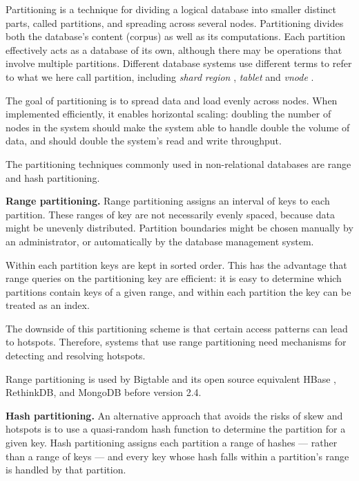 Partitioning is a technique for dividing a logical database into smaller distinct parts, called partitions, and spreading
across several nodes.
Partitioning divides both the database's content (corpus) as well as its computations.
Each partition effectively acts as a database of its own, although there may be operations that involve multiple partitions.
Different database systems use different terms to refer to what we here call partition, including \textit{shard} \cite{mongo:shards, elastic:shards}
\textit{region} \cite{hbase:regions}, \textit{tablet} \cite{bigtable:tablets} and \textit{vnode} \cite{cassandra:vnodes, riak:vnodes}.

The goal of partitioning is to spread data and load evenly across nodes.
When implemented efficiently, it enables horizontal scaling:
doubling the number of nodes in the system should make the system able to handle double the volume of data, and
should double the system's read and write throughput.

The partitioning techniques commonly used in non-relational databases are range and hash partitioning.

\bigskip
\noindent
\textbf{Range partitioning.}
Range partitioning assigns an interval of keys to each partition.
These ranges of key are not necessarily evenly spaced, because data might be unevenly distributed.
Partition boundaries might be chosen manually by an administrator, or automatically by the database management system.

Within each partition keys are kept in sorted order.
This has the advantage that range queries on the partitioning key are efficient:
it is easy to determine which partitions contain keys of a given range, and within each partition the key can be treated
as an index.

The downside of this partitioning scheme is that certain access patterns can lead to hotspots.
Therefore, systems that use range partitioning need mechanisms for detecting and resolving hotspots.

Range partitioning is used by Bigtable and its open source equivalent HBase \cite{hbasebigtable:comparison},
RethinkDB, and MongoDB before version 2.4.

\medskip
\noindent
{}

\bigskip
\noindent
\textbf{Hash partitioning.}
An alternative approach that avoids the risks of skew and hotspots is to use a quasi-random hash function to determine the partition
for a given key.
Hash partitioning assigns each partition a range of hashes --- rather than a range of keys --- and every key whose hash
falls within a partition's range is handled by that partition.

